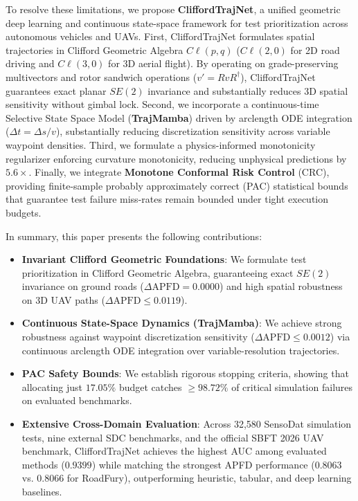 To resolve these limitations, we propose \textbf{CliffordTrajNet}, a unified geometric deep learning and continuous state-space framework for test prioritization across autonomous vehicles and UAVs.
First, CliffordTrajNet formulates spatial trajectories in Clifford Geometric Algebra $C\ell(p, q)$ ($C\ell(2,0)$ for 2D road driving and $C\ell(3,0)$ for 3D aerial flight).
By operating on grade-preserving multivectors and rotor sandwich operations ($v' = R v R^\dagger$), CliffordTrajNet guarantees exact planar $SE(2)$ invariance and substantially reduces 3D spatial sensitivity without gimbal lock.
Second, we incorporate a continuous-time Selective State Space Model (\textbf{TrajMamba}) driven by arclength ODE integration ($\Delta t = \Delta s / v$), substantially reducing discretization sensitivity across variable waypoint densities.
Third, we formulate a physics-informed monotonicity regularizer enforcing curvature monotonicity, reducing unphysical predictions by $5.6\times$.
Finally, we integrate \textbf{Monotone Conformal Risk Control} (CRC), providing finite-sample probably approximately correct (PAC) statistical bounds that guarantee test failure miss-rates remain bounded under tight execution budgets.

In summary, this paper presents the following contributions:
\begin{itemize}
    \item \textbf{Invariant Clifford Geometric Foundations}: We formulate test prioritization in Clifford Geometric Algebra, guaranteeing exact $SE(2)$ invariance on ground roads ($\Delta\mathrm{APFD} = 0.0000$) and high spatial robustness on 3D UAV paths ($\Delta\mathrm{APFD} \le 0.0119$).
    \item \textbf{Continuous State-Space Dynamics (TrajMamba)}: We achieve strong robustness against waypoint discretization sensitivity ($\Delta\mathrm{APFD} \le 0.0012$) via continuous arclength ODE integration over variable-resolution trajectories.
    \item \textbf{PAC Safety Bounds}: We establish rigorous stopping criteria, showing that allocating just $17.05\%$ budget catches $\ge 98.72\%$ of critical simulation failures on evaluated benchmarks.
    \item \textbf{Extensive Cross-Domain Evaluation}: Across 32,580 SensoDat simulation tests, nine external SDC benchmarks, and the official SBFT 2026 UAV benchmark, CliffordTrajNet achieves the highest AUC among evaluated methods ($0.9399$) while matching the strongest APFD performance ($0.8063$ vs. $0.8066$ for RoadFury), outperforming heuristic, tabular, and deep learning baselines.
\end{itemize}
